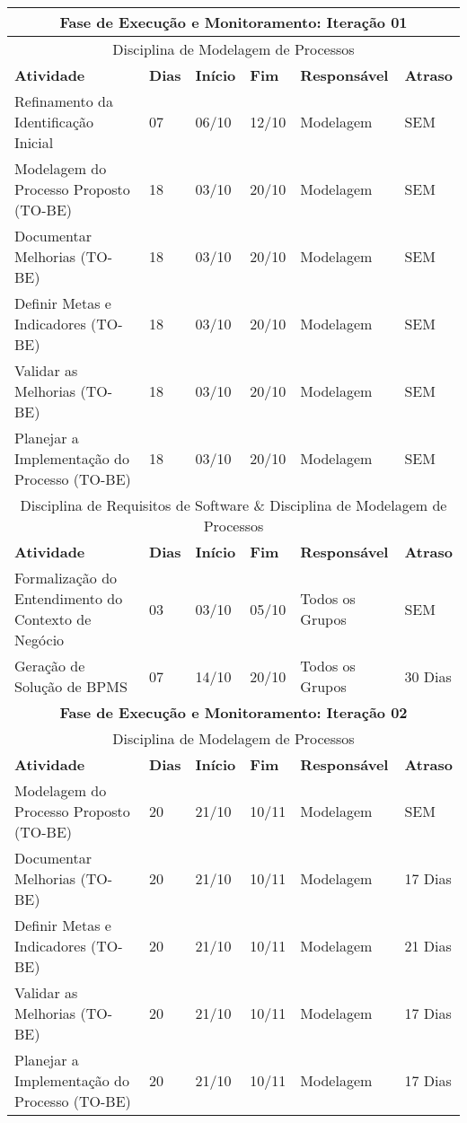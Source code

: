 \begin{center}
	\begin{tabular}{|m{10cm}|m{1cm}|m{1cm}|m{1cm}|m{4cm}|m{2cm}|}
	\hline
	\multicolumn{6}{|c|}{\textbf{Fase de Execução e Monitoramento: Iteração 01}} \\
	\hline
	\multicolumn{6}{|c|}{Disciplina de Modelagem de Processos} \\
	\hline
	\textbf{Atividade} & \textbf{Dias} & \textbf{Início} & \textbf{Fim} & \textbf{Responsável} & \textbf{Atraso} \\ \hline
	Refinamento da Identificação Inicial & 07 & 06/10 & 12/10 & Modelagem & SEM \\ \hline
	Modelagem do Processo Proposto (TO-BE) & 18 & 03/10 & 20/10 & Modelagem & SEM \\ \hline
	Documentar Melhorias (TO-BE) & 18 & 03/10 & 20/10 & Modelagem & SEM \\ \hline
	Definir Metas e Indicadores (TO-BE) & 18 & 03/10 & 20/10 & Modelagem & SEM \\ \hline
	Validar as Melhorias (TO-BE) & 18 & 03/10 & 20/10 & Modelagem & SEM \\ \hline
	Planejar a Implementação do Processo (TO-BE) & 18 & 03/10 & 20/10 & Modelagem & SEM \\ \hline
	\multicolumn{6}{|c|}{Disciplina de Requisitos de Software \& Disciplina de Modelagem de Processos} \\ \hline
	\textbf{Atividade} & \textbf{Dias} & \textbf{Início} & \textbf{Fim} & \textbf{Responsável} & \textbf{Atraso} \\ \hline
	Formalização do Entendimento do Contexto de Negócio & 03 & 03/10 & 05/10 & Todos os Grupos & SEM \\ \hline
	Geração de Solução de BPMS & 07 & 14/10 & 20/10 & Todos os Grupos & 30 Dias \\ \hline
	\multicolumn{6}{|c|}{\textbf{Fase de Execução e Monitoramento: Iteração 02}} \\
	\hline
	\multicolumn{6}{|c|}{Disciplina de Modelagem de Processos} \\
	\hline
	\textbf{Atividade} & \textbf{Dias} & \textbf{Início} & \textbf{Fim} & \textbf{Responsável} & \textbf{Atraso} \\ \hline
	Modelagem do Processo Proposto (TO-BE) & 20 & 21/10 & 10/11 & Modelagem & SEM \\ \hline
	Documentar Melhorias (TO-BE) & 20 & 21/10 & 10/11 & Modelagem & 17 Dias \\ \hline
	Definir Metas e Indicadores (TO-BE) & 20 & 21/10 & 10/11 & Modelagem & 21 Dias \\ \hline
	Validar as Melhorias (TO-BE) & 20 & 21/10 & 10/11 & Modelagem & 17 Dias \\ \hline
	Planejar a Implementação do Processo (TO-BE) & 20 & 21/10 & 10/11 & Modelagem & 17 Dias \\ \hline
	\end{tabular}
\end{center}
